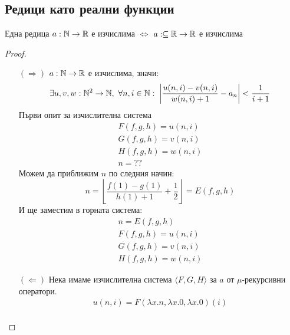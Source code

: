 \subsection{Редици като реални функции}
\begin{proposition}
    Една редица $a: {\mathbb{N}} \to {\mathbb{R}}$ е изчислима $\iff$ $a: \subseteq {\mathbb{R}} \to {\mathbb{R}}$ е изчислима
\end{proposition}
\begin{proof}
    \begin{itemize}
        \item[$(\Rightarrow)$] $a: {\mathbb{N}} \to {\mathbb{R}}$ е изчислима, значи:
        \begin{equation}
            \exists u, v, w: {\mathbb{N}}^2 \to {\mathbb{N}},\ \forall n, i \in {\mathbb{N}}:\; \left| \frac{u(n, i) - v(n, i)}{w(n, i) + 1} - a_n\right| < \frac{1}{i+1}
        \end{equation}
        Първи опит за изчислителна система
        \begin{equation}
            \begin{split}
                F(f, g, h) = u(n, i) \\
                G(f, g, h) = v(n, i) \\
                H(f, g, h) = w(n, i) \\
                n = ??
            \end{split}
        \end{equation}
        Можем да приближим $n$ по следния начин:
        \begin{equation}
            n = \left\lfloor \frac{f(1) - g(1)}{h(1) + 1} + \frac{1}{2}\right\rfloor = E(f, g, h)
        \end{equation}
        И ще заместим в горната система:
        \begin{equation}
            \begin{split}
                n = E(f,g,h) \\
                F(f, g, h) = u(n, i) \\
                G(f, g, h) = v(n, i) \\
                H(f, g, h) = w(n, i)
            \end{split}
        \end{equation}
        \item[$(\Leftarrow)$] Нека имаме изчислителна система $\langle F, G, H\rangle$ за $a$ от $\mu$-рекурсивни оператори.
        \begin{equation}
            \begin{split}
                u(n, i) = F(\lambda x.n, \lambda x.0, \lambda x.0)(i) \\

\end{split}
\end{equation}
\end{itemize}
\end{proof}
